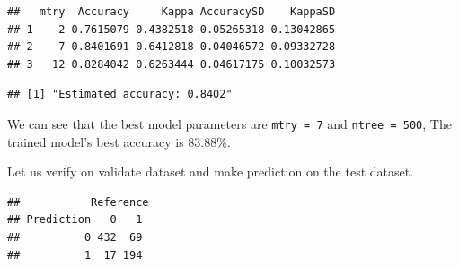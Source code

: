 \documentclass[
]{book}
\newenvironment{Shaded}{\begin{snugshade}}{\end{snugshade}}
\newcommand{\CommentTok}[1]{\textcolor[rgb]{0.56,0.35,0.01}{\textit{#1}}}
\newcommand{\DataTypeTok}[1]{\textcolor[rgb]{0.13,0.29,0.53}{#1}}
\newcommand{\DecValTok}[1]{\textcolor[rgb]{0.00,0.00,0.81}{#1}}
\newcommand{\KeywordTok}[1]{\textcolor[rgb]{0.13,0.29,0.53}{\textbf{#1}}}
\newcommand{\NormalTok}[1]{#1}
\newcommand{\OperatorTok}[1]{\textcolor[rgb]{0.81,0.36,0.00}{\textbf{#1}}}
\newcommand{\StringTok}[1]{\textcolor[rgb]{0.31,0.60,0.02}{#1}}
\begin{document}
\begin{Shaded}
\end{Shaded}

\begin{verbatim}
##   mtry  Accuracy     Kappa AccuracySD    KappaSD
## 1    2 0.7615079 0.4382518 0.05265318 0.13042865
## 2    7 0.8401691 0.6412818 0.04046572 0.09332728
## 3   12 0.8284042 0.6263444 0.04617175 0.10032573
\end{verbatim}

\begin{Shaded}
\end{Shaded}

\begin{verbatim}
## [1] "Estimated accuracy: 0.8402"
\end{verbatim}

We can see that the best model parameters are \texttt{mtry\ =\ 7} and \texttt{ntree\ =\ 500}, The trained model's best accuracy is 83.88\%.

Let us verify on validate dataset and make prediction on the test dataset.

\begin{Shaded}
\end{Shaded}

\begin{verbatim}
##           Reference
## Prediction   0   1
##          0 432  69
##          1  17 194
\end{verbatim}
\end{document}
